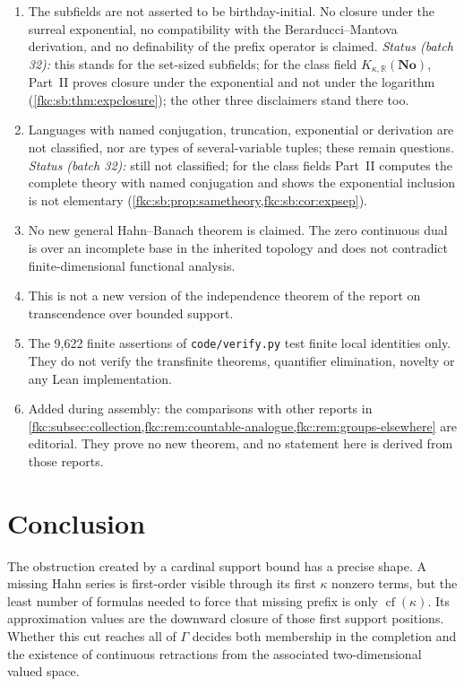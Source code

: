 \documentclass[11pt,letterpaper]{article}
\numberwithin{equation}{section}
\theoremstyle{definition}
\theoremstyle{remark}
\newcommand{\R}{\mathbb R}
\newcommand{\No}{\mathbf{No}}
\newcommand{\cf}{\operatorname{cf}}
\newcommand{\KN}[2]{K_{#1,#2}(\No)}%
\begin{document}
\begin{enumerate}[label=\textup{N\arabic*.}, leftmargin=2.6em]
\item The subfields are not asserted to be birthday-initial. No closure under the surreal exponential, no compatibility with the Berarducci--Mantova derivation, and no definability of the prefix operator is claimed. \emph{Status (batch 32):} this stands for the set-sized subfields; for the class field $\KN\kappa\R$, Part~II proves closure under the exponential and not under the logarithm (\cref{fkc:sb:thm:expclosure}); the other three disclaimers stand there too.
\item Languages with named conjugation, truncation, exponential or derivation are not classified, nor are types of several-variable tuples; these remain questions. \emph{Status (batch 32):} still not classified; for the class fields Part~II computes the complete theory with named conjugation and shows the exponential inclusion is not elementary (\cref{fkc:sb:prop:sametheory,fkc:sb:cor:expsep}).
\item No new general Hahn--Banach theorem is claimed. The zero continuous dual is over an incomplete base in the inherited topology and does not contradict finite-dimensional functional analysis.
\item This is not a new version of the independence theorem of the report on transcendence over bounded support.
\item The 9,622 finite assertions of \texttt{code/verify.py} test finite local identities only. They do not verify the transfinite theorems, quantifier elimination, novelty or any Lean implementation.
\item Added during assembly: the comparisons with other reports in \cref{fkc:subsec:collection,fkc:rem:countable-analogue,fkc:rem:groups-elsewhere} are editorial. They prove no new theorem, and no statement here is derived from those reports.
\end{enumerate}

\section{Conclusion}
The obstruction created by a cardinal support bound has a precise shape. A missing Hahn series is first-order visible through its first $\kappa$ nonzero terms, but the least number of formulas needed to force that missing prefix is only $\cf(\kappa)$. Its approximation values are the downward closure of those first support positions. Whether this cut reaches all of $\Gamma$ decides both membership in the completion and the existence of continuous retractions from the associated two-dimensional valued space.
\end{document}
